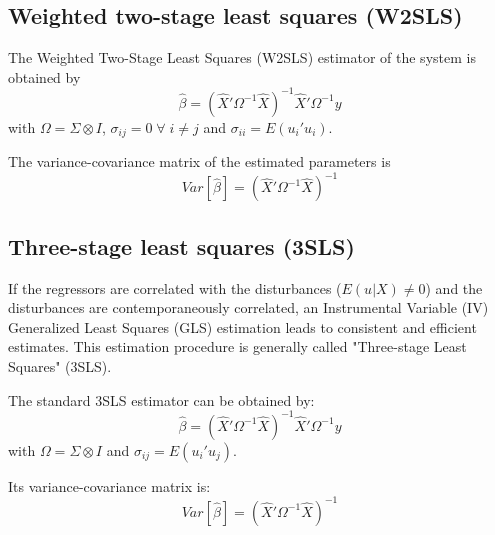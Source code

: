 \subsection{Weighted two-stage least squares (W2SLS)}

The Weighted Two-Stage Least Squares (W2SLS) estimator of the system 
is obtained by
\begin{equation}
   \widehat{\beta} = \left( \widehat{X}' \Omega^{-1} \widehat{X} 
   \right)^{-1} \widehat{X}' \Omega^{-1} y
\end{equation}
with $\Omega = \Sigma \otimes I$, 
$\sigma_{ij} = 0 \; \forall \; i \neq j$ and
$\sigma_{ii} = E \left( u_i' u_i \right)$.

The variance-covariance matrix of the estimated parameters is
\begin{equation}
   Var \left[ \widehat{\beta} \right] = \left( \widehat{X}' \Omega^{-1} 
   \widehat{X} \right)^{-1}
\end{equation}


\subsection{Three-stage least squares (3SLS)}

If the regressors are correlated with the disturbances 
($E \left( u | X \right) \neq 0$) and 
the disturbances are contemporaneously correlated, 
an Instrumental Variable (IV) Generalized Least Squares (GLS) 
estimation leads to consistent and efficient estimates. This estimation 
procedure is generally called "Three-stage Least Squares" (3SLS). 

The standard 3SLS estimator can be obtained by:
\begin{equation}
   \widehat{\beta} = \left( \widehat{X}' \Omega^{-1} \widehat{X} 
   \right)^{-1} \widehat{X}' \Omega^{-1} y
\end{equation}
with $\Omega = \Sigma \otimes I$ and
$\sigma_{ij} = E \left( u_i' u_j \right)$.

Its variance-covariance matrix is:
\begin{equation}
   Var \left[ \widehat{\beta} \right] = \left( \widehat{X}' \Omega^{-1} 
   \widehat{X} \right)^{-1}
   \label{eq:cov3sls}
\end{equation}

